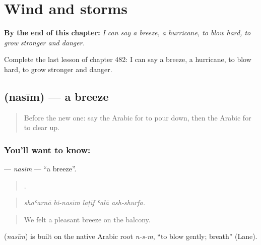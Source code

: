 
\chapter{Wind and storms}
\label{ch:ar-wind-and-storms}

\begin{chapteropening}
\textbf{By the end of this chapter:} \emph{I can say a breeze, a hurricane, to blow hard, to grow stronger and danger.}

Complete the last lesson of chapter 482: I can say a breeze, a hurricane, to blow hard, to grow stronger and danger.
\end{chapteropening}

\section[\texorpdfstring{\ar{نسيم} (nasīm)}{نسيم (nasīm)}]{ (nasīm) — a breeze}

\label{lesson:AR-C482-nasim}



\begin{quote}
Before the new one: say the Arabic for to pour down, then the Arabic for to clear up.
\end{quote}

\subsection*{You'll want to know: }
\textbf{} — \emph{nasīm} — \textquotedblleft{}a breeze\textquotedblright{}.

\begin{quote}
    .
\end{quote}

\begin{quote}
\emph{shaʿarnā bi-nasīm laṭīf ʿalā ash-shurfa.}
\end{quote}

\begin{quote}
We felt a pleasant breeze on the balcony.
\end{quote}

\begin{cousinweb}
\textbf{} (\emph{nasīm}) is built on the native Arabic root \emph{n-s-m}, \textquotedblleft{}to blow gently; breath\textquotedblright{} (Lane).
\end{cousinweb}

